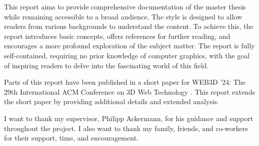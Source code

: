 
This report aims to provide comprehensive documentation of the master thesis while remaining accessible to a broad audience. The style is designed to allow readers from various backgrounds to understand the content. To achieve this, the report introduces basic concepts, offers references for further reading, and encourages a more profound exploration of the subject matter. The report is fully self-contained, requiring no prior knowledge of computer graphics, with the goal of inspiring readers to delve into the fascinating world of this field.

Parts of this report have been published in a short paper for WEB3D '24: The 29th International ACM Conference on 3D Web Technology \cite{ownShortPaper}. This report extends the short paper by providing additional details and extended analysis.

I want to thank my supervisor, Philipp Ackermann, for his guidance and support throughout the project. I also want to thank my family, friends, and co-workers for their support, time, and encouragement.
